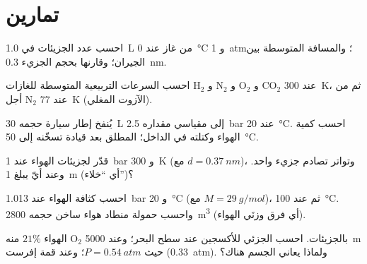 \section{تمارين}

\begin{exercise}[$\star$]\label{exo:b1:kinetic-theory:1}
احسب عدد الجزيئات في \qty{1.0}{L} من غاز عند \qty{0}{\degreeCelsius} و
\qty{1}{atm}؛ والمسافة المتوسطة بين الجيران؛ وقارنها بحجم الجزيء
\qty{0.3}{nm}.
\end{exercise}

\begin{exercise}[$\star$]\label{exo:b1:kinetic-theory:2}
احسب السرعات التربيعية المتوسطة للغازات H$_2$ و N$_2$ و O$_2$ و CO$_2$ عند \qty{300}{K}،
ثم من أجل N$_2$ عند \qty{77}{K} (الآزوت المغلي).
\end{exercise}

\begin{exercise}[$\star$]\label{exo:b1:kinetic-theory:3}
يُنفخ إطار سيارة حجمه \qty{30}{L} إلى  مقياسي مقداره
\qty{2.5}{bar} عند \qty{20}{\degreeCelsius}. احسب كمية الهواء وكتلته في الداخل؛
 المطلق بعد قيادة تسخّنه إلى \qty{50}{\degreeCelsius}.
\end{exercise}

\begin{exercise}[$\star$]\label{exo:b1:kinetic-theory:4}
قدّر  لجزيئات الهواء عند \qty{1}{bar} و \qty{300}{K}
(مع $d = \qty{0.37}{nm}$)، وتواتر تصادم جزيء واحد. وعند
أيّ  يبلغ  \qty{1}{m} (أي ``خلاء'')؟
\end{exercise}

\begin{exercise}[$\star\star$]\label{exo:b1:kinetic-theory:5}
احسب كثافة الهواء عند \qty{1.013}{bar} و \qty{20}{\degreeCelsius}
(مع $M = \qty{29}{g/mol}$)، ثم عند \qty{100}{\degreeCelsius}. واحسب حمولة
منطاد هواء ساخن حجمه \qty{2800}{m^3} (أي فرق وزنَي الهواء).
\end{exercise}

\begin{exercise}[$\star\star$]\label{exo:b1:kinetic-theory:6}
الهواء $21\%$ منه O$_2$ بالجزيئات. احسب  الجزئي للأكسجين عند سطح البحر؛
وعند \qty{5000}{m} حيث $P = \qty{0.54}{atm}$؛ وعند قمة إفرست
(\qty{0.33}{atm}). ولماذا يعاني الجسم هناك؟
\end{exercise}

